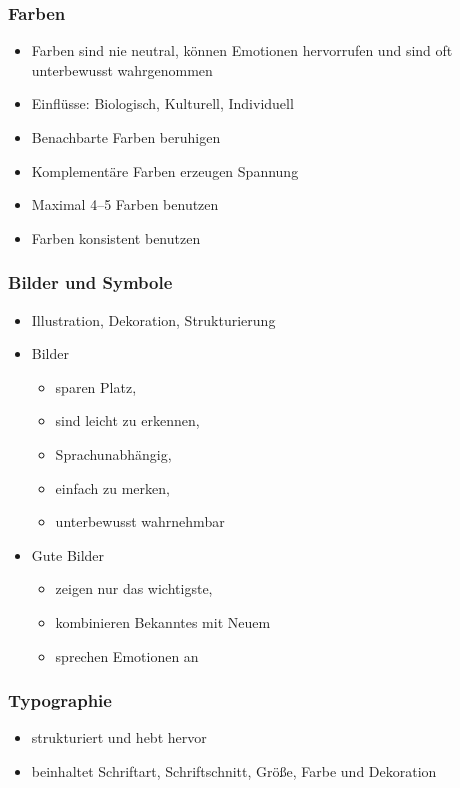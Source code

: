 \documentclass[a4paper,10pt]{article}
\begin{document}
\subsubsection{Farben}
\begin{itemize}
	\item Farben sind nie neutral, können Emotionen hervorrufen und sind oft unterbewusst wahrgenommen
	\item Einflüsse: Biologisch, Kulturell, Individuell
	\item Benachbarte Farben beruhigen
	\item Komplementäre Farben erzeugen Spannung
	\item Maximal 4--5 Farben benutzen
	\item Farben konsistent benutzen
\end{itemize}

\subsubsection{Bilder und Symbole}
\begin{itemize}
	\item Illustration, Dekoration, Strukturierung
	\item Bilder
	\begin{itemize}
		\item sparen Platz,
		\item sind leicht zu erkennen,
		\item Sprachunabhängig,
		\item einfach zu merken,
		\item unterbewusst wahrnehmbar
	\end{itemize}
	\item Gute Bilder
	\begin{itemize}
		\item zeigen nur das wichtigste,
		\item kombinieren Bekanntes mit Neuem
		\item sprechen Emotionen an
	\end{itemize}
\end{itemize}

\subsubsection{Typographie}
\begin{itemize}
	\item strukturiert und hebt hervor
	\item beinhaltet Schriftart, Schriftschnitt, Größe, Farbe und Dekoration
\end{itemize}
\end{document}
